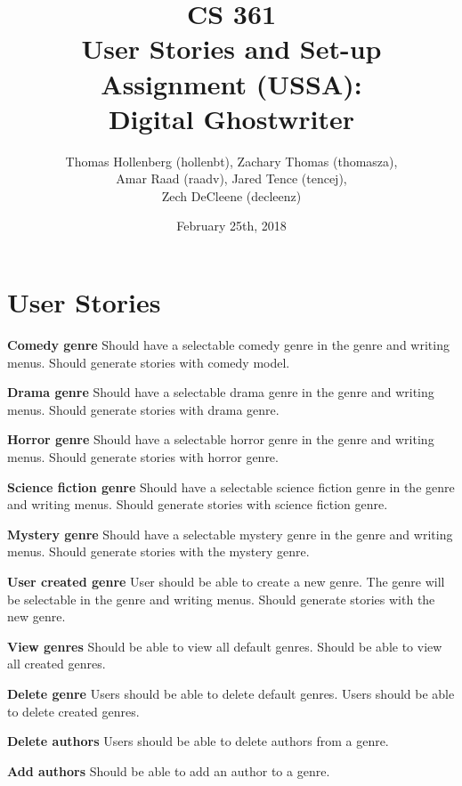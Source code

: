 \documentclass[12pt]{article}
\title{CS 361 \\ User Stories and Set-up Assignment (USSA): \\ Digital Ghostwriter}
\author{Thomas Hollenberg (hollenbt), Zachary Thomas (thomasza),\\ Amar Raad (raadv), Jared Tence (tencej), \\  Zech DeCleene (decleenz)}
\date{February 25th, 2018}
\begin{document}
\maketitle
\newpage
\tableofcontents

\newpage

\section{User Stories}

\textbf{Comedy genre}\newline
Should have a selectable comedy genre in the genre and writing menus.
Should generate stories with comedy model.

\textbf{Drama genre}\newline
Should have a selectable drama genre in the genre and writing menus.
Should generate stories with drama genre.

\textbf{Horror genre}\newline
Should have a selectable horror genre in the genre and writing menus.
Should generate stories with horror genre.

\textbf{Science fiction genre}\newline
Should have a selectable science fiction genre in the genre and writing menus.
Should generate stories with science fiction genre.

\textbf{Mystery genre}\newline
Should have a selectable mystery genre in the genre and writing menus.
Should generate stories with the mystery genre.

\textbf{User created genre}\newline
User should be able to create a new genre.
The genre will be selectable in the genre and writing menus.
Should generate stories with the new genre.

\textbf{View genres}\newline
Should be able to view all default genres.
Should be able to view all created genres.

\textbf{Delete genre}\newline
Users should be able to delete default genres.
Users should be able to delete created genres.

\textbf{Delete authors}\newline
Users should be able to delete authors from a genre.

\textbf{Add authors}\newline
Should be able to add an author to a genre.
\end{document}
